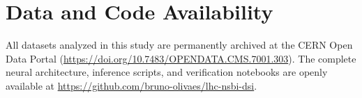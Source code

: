 \documentclass[11pt,a4paper]{article}
\begin{document}
\section*{Data and Code Availability}
All datasets analyzed in this study are permanently archived at the CERN Open Data Portal (\url{https://doi.org/10.7483/OPENDATA.CMS.7001.303}). The complete neural architecture, inference scripts, and verification notebooks are openly available at \url{https://github.com/bruno-olivaes/lhc-nsbi-dsi}.



\end{document}
